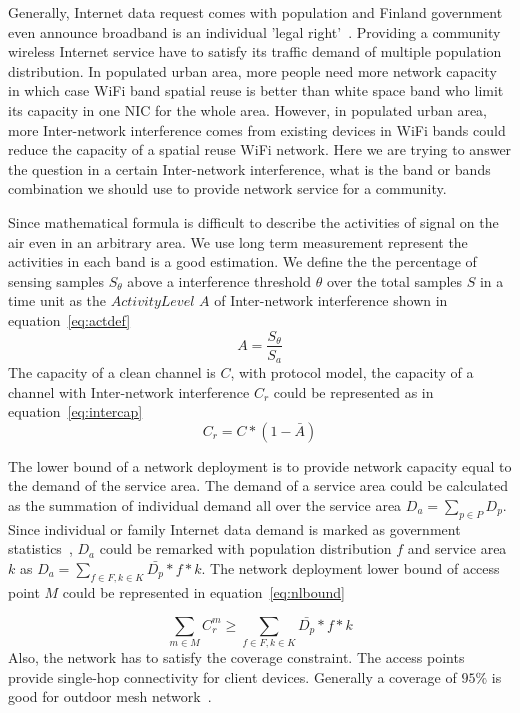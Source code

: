 Generally, Internet data request comes with population and Finland government even announce 
broadband is an individual 'legal right'~\cite{bbcfinland,rosston2011household}. 
Providing a community wireless Internet service have to satisfy its traffic demand 
of multiple population distribution. In populated urban area, more people need more 
network capacity in which case WiFi band spatial reuse is better than white space band 
who limit its capacity in one NIC for the whole area. However, in populated urban area, 
more Inter-network interference comes from existing devices in WiFi
bands could reduce the capacity of a spatial reuse WiFi network. 
Here we are trying to answer the question in a certain Inter-network interference,
what is the band or bands combination we should use to provide network service
 for a community.

Since mathematical formula is difficult to describe the activities of signal on the air even in an arbitrary area.
We use long term measurement represent the activities in each band is a good
estimation. We define the the percentage of sensing samples $S_\theta$ above a 
interference threshold $\theta$ over the total samples $S$ in a time unit as the 
{\it $Activity Level$} $A$ of Inter-network interference shown in equation~\ref{eq:actdef}
\begin{equation}
\label{eq:actdef}
A=\frac{S_\theta}{S_a}
\end{equation}
The capacity of a clean channel is $C$, with protocol model, the capacity of a channel with Inter-network
 interference $C_r$ could be represented as in equation~\ref{eq:intercap}
\begin{equation}
\label{eq:intercap}
C_r=C*(1-\bar{A})
\end{equation}

The lower bound of a network deployment is to provide network capacity equal to the demand of the service 
area. The demand of a service area could be calculated as the summation of individual demand all over 
the service area $D_a=\sum_{p\in P}D_p$. Since individual or family Internet data demand is marked as government 
statistics~\cite{rosston2011household}, $D_a$ could be remarked with population distribution $f$ and service area $k$ as 
$D_a=\sum_{f \in F,k \in K}\bar{D_p}*f*k$. The network deployment lower bound of access point $M$ could be 
represented in equation~\ref{eq:nlbound}

\begin{equation}
\label{eq:nlbound}
\sum_{m \in M}C_r^m \ge \sum_{f \in F,k \in K}\bar{D_p}*f*k
\end{equation}
Also, the network has to satisfy the coverage constraint. The access points provide 
single-hop connectivity for client devices. 
Generally a coverage of $95\%$ is good for outdoor mesh network~\cite{robinson2010deploying}.

